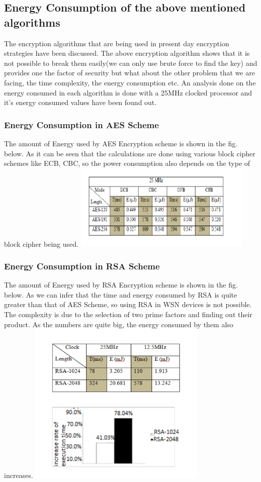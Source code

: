\documentclass[conference]{IEEEtran}
\begin{document}
\subsection{Energy Consumption of the above mentioned algorithms}
\begin{flushleft}
The encryption algorithms that are being used in present day encryption strategies have been discussed. The above encryption algorithm shows that it is not possible to break them easily(we can only use brute force to find the key) and provides one the factor of security but what about the other problem that we are facing, the time complexity, the energy consumption etc. An analysis done on the energy consumed in each algorithm is done with a 25MHz clocked processor and it's energy consumed values have been found out.
\end{flushleft}

\subsubsection{Energy Consumption in AES Scheme}
The amount of Energy used by AES Encryption scheme is shown in the fig. below. As it can be seen that the calculations are done using various block cipher schemes like ECB, CBC, so the power consumption also depends on the type of block cipher being used.
\includegraphics[width=8.5cm]{energy_aes}

\subsubsection{Energy Consumption in RSA Scheme}
The amount of Energy used by RSA Encryption scheme is shown in the fig. below. As we can infer that the time and energy consumed by RSA is quite greater than that of AES Scheme, so using RSA in WSN devices is not possible. The complexity is due to the selection of two prime factors and finding out their product. As the numbers are quite big, the energy consumed by them also increases.
\includegraphics[width=8.5cm]{energy_rsa}
\end{document}
